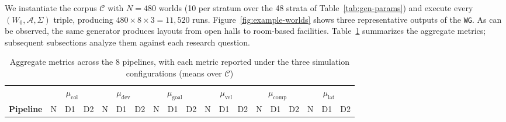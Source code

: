 \documentclass[conference]{IEEEtran}
\begin{document}
We instantiate the corpus $\mathcal{C}$ with $N=480$ worlds (10 per stratum over the 48 strata of Table~\ref{tab:gen-params}) and execute every $(W_0, \mathcal{A}, \Sigma)$ triple, producing $480 \times 8 \times 3 = 11{,}520$ runs.
Figure~\ref{fig:example-worlds} shows three representative outputs of the \texttt{WG}.
As can be observed, the same generator produces layouts from open halls to room-based facilities.
Table~\ref{tab:aggregate} summarizes the aggregate metrics; subsequent subsections analyze them against each research question.
 
\begin{table}[htbp]
    \caption{Aggregate metrics across the 8 pipelines, with each metric reported under the three simulation configurations (means over $\mathcal{C}$)}
    \label{tab:aggregate}
    \begin{center}
        \setlength{\tabcolsep}{3pt}
        \footnotesize
        \begin{tabular}{|l|ccc|ccc|ccc|ccc|ccc|ccc|}
            \hline
            & \multicolumn{3}{c|}{$\mu_{\text{col}}$}
            & \multicolumn{3}{c|}{$\mu_{\text{dev}}$}
            & \multicolumn{3}{c|}{$\mu_{\text{goal}}$}
            & \multicolumn{3}{c|}{$\mu_{\text{vel}}$}
            & \multicolumn{3}{c|}{$\mu_{\text{comp}}$}
            & \multicolumn{3}{c|}{$\mu_{\text{lat}}$} \\
            \textbf{Pipeline}
            & N & D1 & D2 & N & D1 & D2 & N & D1 & D2 & N & D1 & D2 & N & D1 & D2 & N & D1 & D2 \\
            \hline
 

\end{tabular}
\end{center}
\end{table}
\end{document}
